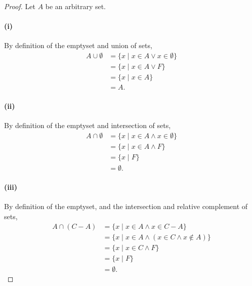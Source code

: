 \documentclass{report}
\begin{document}
  \begin{proof}

    Let $A$ be an arbitrary set.

    \paragraph{(i)}%

      By definition of the emptyset and union of sets,
        \begin{align*}
          A \cup \emptyset
            & = \{ x \mid x \in A \lor x \in \emptyset \} \\
            & = \{ x \mid x \in A \lor F \} \\
            & = \{ x \mid x \in A \} \\
            & = A.
        \end{align*}

    \paragraph{(ii)}%

      By definition of the emptyset and intersection of sets,
        \begin{align*}
          A \cap \emptyset
            & = \{ x \mid x \in A \land x \in \emptyset \} \\
            & = \{ x \mid x \in A \land F \} \\
            & = \{ x \mid F \} \\
            & = \emptyset.
        \end{align*}

    \paragraph{(iii)}%

      By definition of the emptyset, and the intersection and relative
        complement of sets,
        \begin{align*}
          A \cap (C - A)
            & = \{ x \mid x \in A \land x \in C - A \} \\
            & = \{ x \mid x \in A \land (x \in C \land x \not\in A) \} \\
            & = \{ x \mid x \in C \land F \} \\
            & = \{ x \mid F \} \\
            & = \emptyset.
        \end{align*}

  \end{proof}
\end{document}
